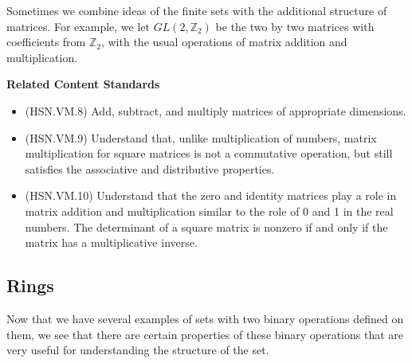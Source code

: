 \documentclass[
]{book}
\providecommand{\tightlist}{%
  \setlength{\itemsep}{0pt}\setlength{\parskip}{0pt}}
\newenvironment{standards}{}{}
\theoremstyle{definition}
\theoremstyle{definition}
\theoremstyle{definition}
\theoremstyle{definition}
\theoremstyle{remark}
\begin{document}
Sometimes we combine ideas of the finite sets with the additional structure of matrices. For example, we let \(GL(2,\mathbb{Z}_2)\) be the two by two matrices with coefficients from \(\mathbb{Z}_2\), with the usual operations of matrix addition and multiplication.

\begin{standards}

\begin{center}
\textbf{Related Content Standards}

\end{center}

\begin{itemize}
\tightlist
\item
  (HSN.VM.8) Add, subtract, and multiply matrices of appropriate dimensions.
\item
  (HSN.VM.9) Understand that, unlike multiplication of numbers, matrix multiplication for square matrices is not a commutative operation, but still satisfies the associative and distributive properties.
\item
  (HSN.VM.10) Understand that the zero and identity matrices play a role in matrix addition and multiplication similar to the role of 0 and 1 in the real numbers. The determinant of a square matrix is nonzero if and only if the matrix has a multiplicative inverse.
\end{itemize}

\end{standards}

\hypertarget{secrings}{%
\subsection{Rings}\label{secrings}}

Now that we have several examples of sets with two binary operations defined on them, we see that there are certain properties of these binary operations that are very useful for understanding the structure of the set.
\end{document}
